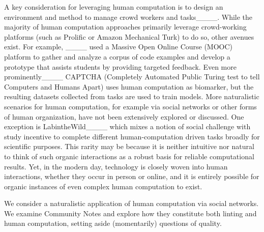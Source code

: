 A key consideration for leveraging human computation is to design an environment and method to manage crowd workers and tasks____. While the majority of human computation approaches primarily leverage crowd-working platforms (such as Prolific or Amazon Mechanical Turk) to do so, other avenues exist.
For example, ____ used a Massive Open Online Course (MOOC) platform to gather and analyze a corpus of code examples and develop a prototype that assists students by providing targeted feedback.
Even more prominently____ CAPTCHA (Completely Automated Public Turing test to tell Computers and Humans Apart) uses human computation as biomarker, but the resulting datasets collected from tasks are used to train models.
More naturalistic scenarios for human computation, for example via social networks or other forms of human organization, have not been extensively explored or discussed.
One exception is LabintheWild____ which mixes a notion of social challenge with study incentive to complete different human-computation driven tasks broadly for scientific purposes.
This rarity may be because it is neither intuitive nor natural to think of such organic interactions as a robust basis for reliable computational results. Yet, in the modern day, technology is closely woven into human interactions, whether they occur in person or online, and it is entirely possible for organic instances of even complex human computation to exist.

We consider a naturalistic application of human computation via social networks. We examine Community Notes and explore how they constitute both linting and human computation, setting aside (momentarily) questions of quality.











